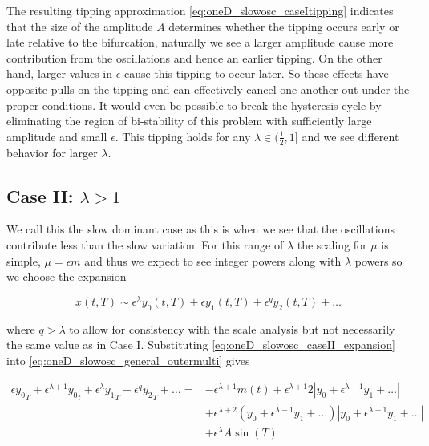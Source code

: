 The resulting tipping approximation \eqref{eq:oneD_slowosc_caseItipping} indicates that the size of the amplitude $A$ determines whether the tipping occurs early or late relative to the bifurcation, naturally we see a larger amplitude cause more contribution from the oscillations and hence an earlier tipping. On the other hand, larger values in $\epsilon$ cause this tipping to occur later. So these effects have opposite pulls on the tipping and can effectively cancel one another out under the proper conditions. It would even be possible to break the hysteresis cycle by eliminating the region of bi-stability of this problem with sufficiently large amplitude and small $\epsilon$. This tipping holds for any $\lambda\in (\frac{1}{2},1]$ and we see different behavior for larger $\lambda$.

\subsection{Case II: $\lambda>1$}
\label{subsec:oneD_slowosc_caseII}

We call this the slow dominant case as this is when we see that the oscillations contribute less than the slow variation. For this range of $\lambda$ the scaling for $\mu$ is simple, $\mu=\epsilon m$ and thus we expect to see integer powers along with $\lambda$ powers so we choose the expansion

\begin{equation}\label{eq:oneD_slowosc_caseII_expansion}
x(t,T) \sim \epsilon^\lambda y_0(t,T)+\epsilon y_1(t,T)+\epsilon^q y_2(t,T)+\ldots
\end{equation}


where $q>\lambda$ to allow for consistency with the scale analysis but not necessarily the same value as in Case I. Substituting \eqref{eq:oneD_slowosc_caseII_expansion} into \eqref{eq:oneD_slowosc_general_outermulti} gives

\begin{equation*}
\begin{aligned}
\epsilon {y_0}_T+\epsilon^{\lambda+1} {y_0}_t+\epsilon^\lambda {y_1}_T+\epsilon^q {y_2}_T+\ldots=&-\epsilon^{\lambda+1}m(t)+\epsilon^{\lambda+1} 2|y_0+\epsilon^{\lambda-1} y_1 +\ldots|\\
&+ \epsilon^{\lambda+2}( y_0+\epsilon^{\lambda-1} y_1 +\ldots)| y_0+\epsilon^{\lambda-1} y_1 +\ldots|\\
&+\epsilon^\lambda A\sin(T) 
\end{aligned}
\end{equation*}

